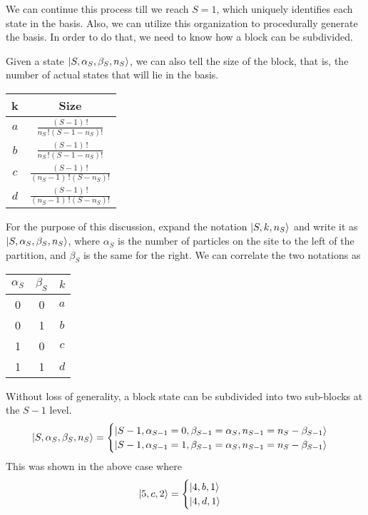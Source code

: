 	We can continue this process till we reach $ S = 1 $, which uniquely identifies each state in the basis. Also, we can utilize this organization to procedurally generate the basis. In order to do that, we need to know how a block can be subdivided. 
	
	Given a state $ \ket{S, \alpha_S, \beta_S, n_S} $, we can also tell the size of the block, that is, the number of actual states that will lie in the basis.
	\begin{table}[h!]
		\centering
		\begin{tabular}{cc}
			\toprule
			k & Size \\
			\midrule
			$ a $ & $ \frac{(S-1)\,!}{n_S\,!(S - 1 -n_S)!} $ \vspace{3mm}\\
			$ b $ & $ \frac{(S-1)\,!}{n_S\,!(S - 1 -n_S)!} $ \vspace{3mm}\\
			$ c $ & $ \frac{(S-1)\,!}{(n_S - 1)\,!(S -n_S)!} $ \vspace{3mm}\\
			$ d $ & $ \frac{(S-1)\,!}{(n_S - 1)\,!(S -n_S)!} $\\
			\bottomrule
		\end{tabular}
	\end{table}
	
	For the purpose of this discussion, expand the notation $ \ket{S, k, n_S} $ and write it as $ \ket{S, \alpha_S, \beta_S, n_S} $, where $ \alpha_S $ is the number of particles on the site to the left of the partition, and $ \beta_S $ is the same for the right. We can correlate the two notations as
	\begin{table}[h!]
		\centering
		\begin{tabular}{ccc}
			\toprule
			$ \alpha_S $ & $ \beta_S $ & $ k $ \\
			\midrule
			0 & 0 & $ a $\\
			0 & 1 & $ b $\\
			1 & 0 & $ c $\\
			1 & 1 & $ d $\\
			\bottomrule
		\end{tabular}
	\end{table}
	
	Without loss of generality, a block state can be subdivided into two sub-blocks at the $ S-1 $ level.
	\begin{align*}
		\ket{S, \alpha_S, \beta_S, n_S} = 
		\begin{cases}
			\ket{S-1, \alpha_{S-1} = 0, \beta_{S-1} = \alpha_S, n_{S-1} = n_S - \beta_{S-1} }\\
			\ket{S-1, \alpha_{S-1} = 1, \beta_{S-1} = \alpha_S, n_{S-1} = n_S - \beta_{S-1} }\\
		\end{cases}
	\end{align*}
	This was shown in the above case where
	\begin{align*}
		\ket{5,c, 2} =
		\begin{cases}
			\ket{4,b, 1}\\
			\ket{4, d, 1}
		\end{cases}
	\end{align*}
	
